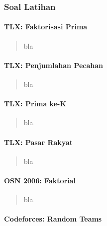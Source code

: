 \documentclass[]{article}
\let\oldparagraph\paragraph
\renewcommand{\paragraph}[1]{\oldparagraph{#1}\mbox{}}
\begin{document}
\paragraph{}\label{rekomandasi-soal-soal-latihan}

\subsubsection{Soal Latihan}\label{soal-latihan}

\paragraph{TLX: Faktorisasi Prima}\label{tlx-faktorisasi-prima}

\begin{quote}
bla
\end{quote}

\paragraph{TLX: Penjumlahan Pecahan}\label{tlx-penjumlahan-pecahan}

\begin{quote}
bla
\end{quote}

\paragraph{TLX: Prima ke-K}\label{tlx-prima-ke-k}

\begin{quote}
bla
\end{quote}

\paragraph{TLX: Pasar Rakyat}\label{tlx-pasar-rakyat}

\begin{quote}
bla
\end{quote}

\paragraph{OSN 2006: Faktorial}\label{osn-2006-faktorial}

\begin{quote}
bla
\end{quote}

\paragraph{Codeforces: Random Teams}\label{codeforces-random-teams}
\end{document}
